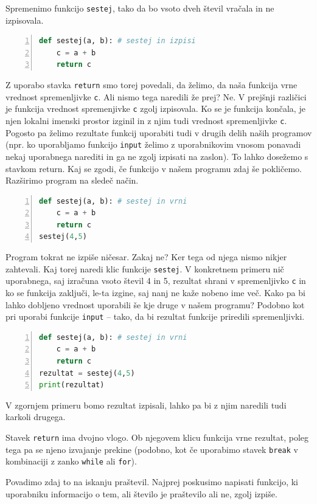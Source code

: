 Spremenimo funkcijo \texttt{sestej}, tako da bo vsoto dveh števil vračala in ne izpisovala.
\begin{lstlisting}[language=Python, showstringspaces=false,numbers=left]
def sestej(a, b): # sestej in izpisi
    c = a + b
    return c
\end{lstlisting}
Z uporabo stavka \texttt{return} smo torej povedali, da želimo, da naša funkcija vrne vrednost spremenljivke \texttt{c}. Ali nismo tega naredili že prej? Ne. V prejšnji različici je funkcija vrednost spremenjivke \texttt{c} zgolj izpisovala. Ko se je funkcija končala, je njen lokalni imenski prostor izginil in z njim tudi vrednost spremenljivke \texttt{c}. Pogosto pa želimo rezultate funkcij uporabiti tudi v drugih delih naših programov (npr. ko uporabljamo funkcijo \texttt{input} želimo z uporabnikovim vnosom ponavadi nekaj uporabnega narediti in ga ne zgolj izpisati na zaslon). To lahko dosežemo s stavkom return. Kaj se zgodi, če funkcijo v našem programu zdaj še pokličemo. Razširimo program na sledeč način.
\begin{lstlisting}[language=Python, showstringspaces=false,numbers=left]
def sestej(a, b): # sestej in vrni
    c = a + b
    return c
sestej(4,5)
\end{lstlisting}
Program tokrat ne izpiše ničesar. Zakaj ne? Ker tega od njega nismo nikjer zahtevali. Kaj torej naredi klic funkcije \texttt{sestej}. V konkretnem primeru nič uporabnega, saj izračuna vsoto števil 4 in 5, rezultat shrani v spremenljivko \texttt{c} in ko se funkcija zaključi, le-ta izgine, saj nanj ne kaže nobeno ime več. Kako pa bi lahko dobljeno vrednost uporabili še kje druge v našem programu? Podobno kot pri uporabi funkcije \texttt{input} -- tako, da bi rezultat funkcije priredili spremenljivki.
\begin{lstlisting}[language=Python, showstringspaces=false,numbers=left]
def sestej(a, b): # sestej in vrni
    c = a + b
    return c
rezultat = sestej(4,5)
print(rezultat)
\end{lstlisting}
V zgornjem primeru bomo rezultat izpisali, lahko pa bi z njim naredili tudi karkoli drugega.


Stavek \texttt{return} ima dvojno vlogo. Ob njegovem klicu funkcija vrne rezultat, poleg tega pa se njeno izvajanje prekine (podobno, kot če uporabimo stavek \texttt{break} v kombinaciji z zanko \texttt{while} ali \texttt{for}).

Povadimo zdaj to na iskanju praštevil. Najprej poskusimo napisati funkcijo, ki uporabniku informacijo o tem, ali število je praštevilo ali ne, zgolj izpiše.


